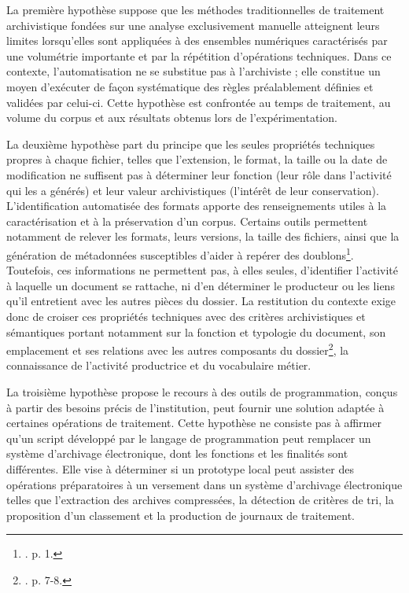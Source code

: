  La première hypothèse suppose que les méthodes traditionnelles de traitement archivistique fondées sur une analyse exclusivement manuelle atteignent leurs limites lorsqu’elles sont appliquées à des ensembles numériques caractérisés par une volumétrie importante et par la répétition d’opérations techniques. Dans ce contexte, l’automatisation ne se substitue pas à l’archiviste ; elle constitue un moyen d’exécuter de façon systématique des règles préalablement définies et validées par celui-ci. Cette hypothèse est confrontée au temps de traitement, au volume du corpus et aux résultats obtenus lors de l’expérimentation.
 
 La deuxième hypothèse part du principe que les seules propriétés techniques propres à chaque fichier, telles que l’extension, le format, la taille ou la date de modification ne suffisent pas à déterminer leur fonction (leur rôle dans l’activité qui les a générés) et leur valeur archivistiques (l’intérêt de leur conservation). L’identification automatisée des formats apporte des renseignements utiles à la caractérisation et à la préservation d’un corpus. Certains outils permettent notamment de relever les formats, leurs versions, la taille des fichiers, ainsi que la génération de métadonnées susceptibles d’aider à repérer des doublons\footnote{\cite{national-archives-droid}. p. 1.}. Toutefois, ces informations ne permettent pas, à elles seules, d'identifier l’activité à laquelle un document se rattache, ni d'en déterminer le producteur ou les liens qu’il entretient avec les autres pièces du dossier. La restitution du contexte exige donc de croiser ces propriétés techniques avec des critères archivistiques et sémantiques portant notamment sur la fonction et typologie du document, son emplacement et ses relations avec les autres composants du dossier\footnote{\cite{ric-fad-2023}. p. 7-8.}, la connaissance de l'activité productrice et du vocabulaire métier.
 
 La troisième hypothèse propose le recours à des outils de programmation, conçus à partir des besoins précis de l’institution, peut fournir une solution adaptée à certaines opérations de traitement. Cette hypothèse ne consiste pas à affirmer qu’un script développé par le langage de programmation peut remplacer un système d’archivage électronique, dont les fonctions et les finalités sont différentes. Elle vise à déterminer si un prototype local peut assister des opérations préparatoires à un versement dans un système d’archivage électronique telles que l’extraction des archives compressées, la détection de critères de tri, la proposition d’un classement et la production de journaux de traitement.
 
